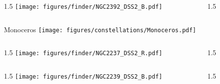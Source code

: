 \documentclass[final]{beamer}
\newlength{\colwidth}
\begin{document}

\begin{frame}[t]{}
  \begin{columns}[T]
    \begin{column}{1.5\colwidth}
      \centering
      \texttt{[image: figures/finder/NGC2392\_DSS2\_B.pdf]}
    \end{column}
    \begin{column}{1.5\colwidth}
      \Large
      
    \end{column}
  \end{columns}
  \vspace{\fill}
\end{frame}


\begin{frame}[t]{\LARGE Monoceros}
  \centering
  \texttt{[image: figures/constellations/Monoceros.pdf]}
\end{frame}


\begin{frame}[t]{}
  \begin{columns}[T]
    \begin{column}{1.5\colwidth}
      \centering
      \texttt{[image: figures/finder/NGC2237\_DSS2\_R.pdf]}
    \end{column}
    \begin{column}{1.5\colwidth}
      \Large
      
    \end{column}
  \end{columns}
  \vspace{\fill}
  \begin{columns}[T]
    \begin{column}{1.5\colwidth}
      \centering
      \texttt{[image: figures/finder/NGC2239\_DSS2\_B.pdf]}
    \end{column}
    \begin{column}{1.5\colwidth}
      \Large
      
    \end{column}
  \end{columns}
\end{frame}
\end{document}
